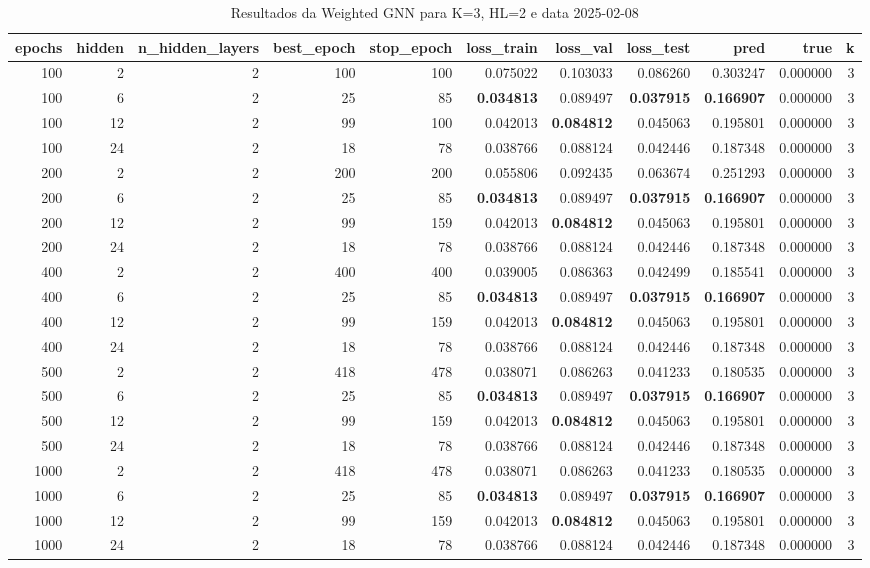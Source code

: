 \begin{table}
\caption{Resultados da Weighted GNN para K=3, HL=2 e data 2025-02-08}
\label{tab:weighted_gnn_results_k3_hl2_d20250208}
\begin{tabular}{rrrrrrrrrrr}
\toprule
epochs & hidden & n\_hidden\_layers & best\_epoch & stop\_epoch & loss\_train & loss\_val & loss\_test & pred & true & k \\
\midrule
100 & 2 & 2 & 100 & 100 & 0.075022 & 0.103033 & 0.086260 & 0.303247 & 0.000000 & 3 \\
100 & 6 & 2 & 25 & 85 & \textbf{0.034813} & 0.089497 & \textbf{0.037915} & \textbf{0.166907} & 0.000000 & 3 \\
100 & 12 & 2 & 99 & 100 & 0.042013 & \textbf{0.084812} & 0.045063 & 0.195801 & 0.000000 & 3 \\
100 & 24 & 2 & 18 & 78 & 0.038766 & 0.088124 & 0.042446 & 0.187348 & 0.000000 & 3 \\
200 & 2 & 2 & 200 & 200 & 0.055806 & 0.092435 & 0.063674 & 0.251293 & 0.000000 & 3 \\
200 & 6 & 2 & 25 & 85 & \textbf{0.034813} & 0.089497 & \textbf{0.037915} & \textbf{0.166907} & 0.000000 & 3 \\
200 & 12 & 2 & 99 & 159 & 0.042013 & \textbf{0.084812} & 0.045063 & 0.195801 & 0.000000 & 3 \\
200 & 24 & 2 & 18 & 78 & 0.038766 & 0.088124 & 0.042446 & 0.187348 & 0.000000 & 3 \\
400 & 2 & 2 & 400 & 400 & 0.039005 & 0.086363 & 0.042499 & 0.185541 & 0.000000 & 3 \\
400 & 6 & 2 & 25 & 85 & \textbf{0.034813} & 0.089497 & \textbf{0.037915} & \textbf{0.166907} & 0.000000 & 3 \\
400 & 12 & 2 & 99 & 159 & 0.042013 & \textbf{0.084812} & 0.045063 & 0.195801 & 0.000000 & 3 \\
400 & 24 & 2 & 18 & 78 & 0.038766 & 0.088124 & 0.042446 & 0.187348 & 0.000000 & 3 \\
500 & 2 & 2 & 418 & 478 & 0.038071 & 0.086263 & 0.041233 & 0.180535 & 0.000000 & 3 \\
500 & 6 & 2 & 25 & 85 & \textbf{0.034813} & 0.089497 & \textbf{0.037915} & \textbf{0.166907} & 0.000000 & 3 \\
500 & 12 & 2 & 99 & 159 & 0.042013 & \textbf{0.084812} & 0.045063 & 0.195801 & 0.000000 & 3 \\
500 & 24 & 2 & 18 & 78 & 0.038766 & 0.088124 & 0.042446 & 0.187348 & 0.000000 & 3 \\
1000 & 2 & 2 & 418 & 478 & 0.038071 & 0.086263 & 0.041233 & 0.180535 & 0.000000 & 3 \\
1000 & 6 & 2 & 25 & 85 & \textbf{0.034813} & 0.089497 & \textbf{0.037915} & \textbf{0.166907} & 0.000000 & 3 \\
1000 & 12 & 2 & 99 & 159 & 0.042013 & \textbf{0.084812} & 0.045063 & 0.195801 & 0.000000 & 3 \\
1000 & 24 & 2 & 18 & 78 & 0.038766 & 0.088124 & 0.042446 & 0.187348 & 0.000000 & 3 \\
\bottomrule
\end{tabular}
\end{table}

